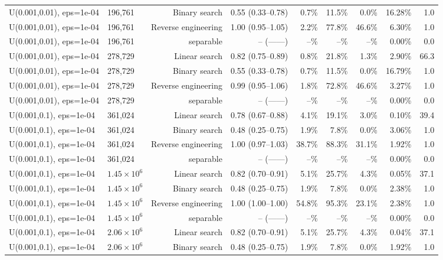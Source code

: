 \begin{tabular}{llrrrrrrr}
U(0.001,0.01), eps=1e-04 & 196,761 & Binary search & 0.55 (0.33--0.78) & 0.7\% & 11.5\% & 0.0\% & 16.28\% & 1.0 \\
U(0.001,0.01), eps=1e-04 & 196,761 & Reverse engineering & 1.00 (0.95--1.05) & 2.2\% & 77.8\% & 46.6\% & 6.30\% & 1.0 \\
U(0.001,0.01), eps=1e-04 & 196,761 & separable & -- (------) & --\% & --\% & --\% & 0.00\% & 0.0 \\
U(0.001,0.01), eps=1e-04 & 278,729 & Linear search & 0.82 (0.75--0.89) & 0.8\% & 21.8\% & 1.3\% & 2.90\% & 66.3 \\
U(0.001,0.01), eps=1e-04 & 278,729 & Binary search & 0.55 (0.33--0.78) & 0.7\% & 11.5\% & 0.0\% & 16.79\% & 1.0 \\
U(0.001,0.01), eps=1e-04 & 278,729 & Reverse engineering & 0.99 (0.95--1.06) & 1.8\% & 72.8\% & 46.6\% & 3.27\% & 1.0 \\
U(0.001,0.01), eps=1e-04 & 278,729 & separable & -- (------) & --\% & --\% & --\% & 0.00\% & 0.0 \\
U(0.001,0.1), eps=1e-04 & 361,024 & Linear search & 0.78 (0.67--0.88) & 4.1\% & 19.1\% & 3.0\% & 0.10\% & 39.4 \\
U(0.001,0.1), eps=1e-04 & 361,024 & Binary search & 0.48 (0.25--0.75) & 1.9\% & 7.8\% & 0.0\% & 3.06\% & 1.0 \\
U(0.001,0.1), eps=1e-04 & 361,024 & Reverse engineering & 1.00 (0.97--1.03) & 38.7\% & 88.3\% & 31.1\% & 1.92\% & 1.0 \\
U(0.001,0.1), eps=1e-04 & 361,024 & separable & -- (------) & --\% & --\% & --\% & 0.00\% & 0.0 \\
U(0.001,0.1), eps=1e-04 & $1.45\times 10^{6}$ & Linear search & 0.82 (0.70--0.91) & 5.1\% & 25.7\% & 4.3\% & 0.05\% & 37.1 \\
U(0.001,0.1), eps=1e-04 & $1.45\times 10^{6}$ & Binary search & 0.48 (0.25--0.75) & 1.9\% & 7.8\% & 0.0\% & 2.38\% & 1.0 \\
U(0.001,0.1), eps=1e-04 & $1.45\times 10^{6}$ & Reverse engineering & 1.00 (1.00--1.00) & 54.8\% & 95.3\% & 23.1\% & 2.38\% & 1.0 \\
U(0.001,0.1), eps=1e-04 & $1.45\times 10^{6}$ & separable & -- (------) & --\% & --\% & --\% & 0.00\% & 0.0 \\
U(0.001,0.1), eps=1e-04 & $2.06\times 10^{6}$ & Linear search & 0.82 (0.70--0.91) & 5.1\% & 25.7\% & 4.3\% & 0.04\% & 37.1 \\
U(0.001,0.1), eps=1e-04 & $2.06\times 10^{6}$ & Binary search & 0.48 (0.25--0.75) & 1.9\% & 7.8\% & 0.0\% & 1.92\% & 1.0 \\

\end{tabular}
